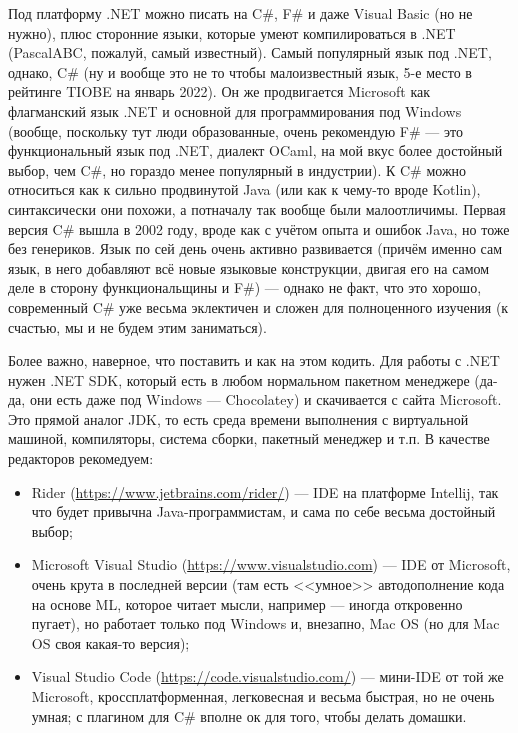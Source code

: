 \documentclass[a5paper]{article}
\begin{document}
Под платформу .NET можно писать на C\#, F\# и даже Visual Basic (но не нужно), плюс сторонние языки, которые умеют компилироваться в .NET (PascalABC, пожалуй, самый известный). Самый популярный язык под .NET, однако, C\# (ну и вообще это не то чтобы малоизвестный язык, 5-е место в рейтинге TIOBE на январь 2022). Он же продвигается Microsoft как флагманский язык .NET и основной для программирования под Windows (вообще, поскольку тут люди образованные, очень рекомендую F\# --- это функциональный язык под .NET, диалект OCaml, на мой вкус более достойный выбор, чем C\#, но гораздо менее популярный в индустрии). К C\# можно относиться как к сильно продвинутой Java (или как к чему-то вроде Kotlin), синтаксически они похожи, а потначалу так вообще были малоотличимы. Первая версия C\# вышла в 2002 году, вроде как с учётом опыта и ошибок Java, но тоже без генериков. Язык по сей день очень активно развивается (причём именно сам язык, в него добавляют всё новые языковые конструкции, двигая его на самом деле в сторону функциональщины и F\#) --- однако не факт, что это хорошо, современный C\# уже весьма эклектичен и сложен для полноценного изучения (к счастью, мы и не будем этим заниматься).

Более важно, наверное, что поставить и как на этом кодить. Для работы с .NET нужен .NET SDK, который есть в любом нормальном пакетном менеджере (да-да, они есть даже под Windows --- Chocolatey) и скачивается с сайта Microsoft. Это прямой аналог JDK, то есть среда времени выполнения с виртуальной машиной, компиляторы, система сборки, пакетный менеджер и т.п. В качестве редакторов рекомедуем:

\begin{itemize}
    \item Rider (\url{https://www.jetbrains.com/rider/}) --- IDE на платформе Intellij, так что будет привычна Java-программистам, и сама по себе весьма достойный выбор;
    \item Microsoft Visual Studio (\url{https://www.visualstudio.com}) --- IDE от Microsoft, очень крута в последней версии (там есть <<умное>> автодополнение кода на основе ML, которое читает мысли, например --- иногда откровенно пугает), но работает только под Windows и, внезапно, Mac OS (но для Mac OS своя какая-то версия);
    \item Visual Studio Code (\url{https://code.visualstudio.com/}) --- мини-IDE от той же Microsoft, кроссплатформенная, легковесная и весьма быстрая, но не очень умная; с плагином для C\# вполне ок для того, чтобы делать домашки.
\end{itemize}
\end{document}
